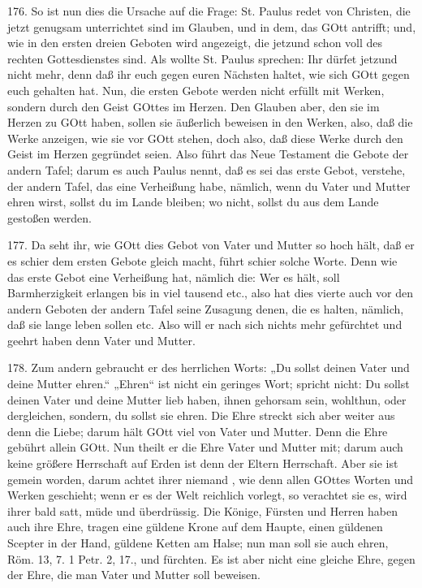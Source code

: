 176. So ist nun dies die Ursache auf die Frage: St. Paulus redet von Christen, die jetzt genugsam unterrichtet sind im Glauben, und in dem, das GOtt antrifft; und, wie in den ersten dreien Geboten wird angezeigt, die jetzund schon voll des rechten Gottesdienstes sind. Als wollte St. Paulus sprechen: Ihr dürfet jetzund nicht mehr, denn daß ihr euch gegen euren Nächsten haltet, wie sich GOtt gegen euch gehalten hat. Nun, die ersten Gebote werden nicht erfüllt mit Werken, sondern durch den Geist GOttes im Herzen. Den Glauben aber, den sie im Herzen zu GOtt haben, sollen sie äußerlich beweisen in den Werken, also, daß die Werke anzeigen, wie sie vor GOtt stehen, doch also, daß diese Werke durch den Geist im Herzen gegründet seien. Also führt das Neue Testament die Gebote der andern Tafel; darum es auch Paulus nennt, daß es sei das erste Gebot, verstehe, der andern Tafel, das eine Verheißung habe, nämlich, wenn du Vater und Mutter ehren wirst, sollst du im Lande bleiben; wo nicht, sollst du aus dem Lande gestoßen werden.

177. Da seht ihr, wie GOtt dies Gebot von Vater und Mutter so hoch hält, daß er es schier dem ersten Gebote gleich macht, führt schier solche Worte. Denn wie das erste Gebot eine Verheißung hat, nämlich die: Wer es hält, soll Barmherzigkeit erlangen bis in viel tausend etc., also hat dies vierte auch vor den andern Geboten der andern Tafel seine Zusagung denen, die es halten, nämlich, daß sie lange leben sollen etc. Also will er nach sich nichts mehr gefürchtet und geehrt haben denn Vater und Mutter.

178. Zum andern gebraucht er des herrlichen Worts: „Du sollst deinen Vater und deine Mutter ehren.“ „Ehren“ ist nicht ein geringes Wort; spricht nicht: Du sollst deinen Vater und deine Mutter lieb haben, ihnen gehorsam sein, wohlthun, oder dergleichen, sondern, du sollst sie ehren. Die Ehre streckt sich aber weiter aus denn die Liebe; darum hält GOtt viel von Vater und Mutter. Denn die Ehre gebührt allein GOtt. Nun theilt er die Ehre Vater und Mutter mit; darum auch keine größere Herrschaft auf Erden ist denn der Eltern Herrschaft. Aber sie ist gemein worden, darum achtet ihrer niemand
, wie denn allen GOttes Worten und Werken geschieht; wenn er es der Welt reichlich vorlegt, so verachtet sie es, wird ihrer bald satt, müde und überdrüssig. Die Könige, Fürsten und Herren haben auch ihre Ehre, tragen eine güldene Krone auf dem Haupte, einen güldenen Scepter in der Hand, güldene Ketten am Halse; nun man soll sie auch ehren, Röm. 13, 7. 1 Petr. 2, 17., und fürchten. Es ist aber nicht eine gleiche Ehre, gegen der Ehre, die man Vater und Mutter soll beweisen.

